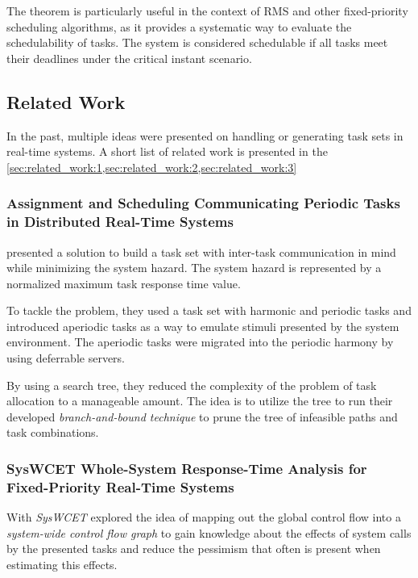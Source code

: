The theorem is particularly useful in the context of \ac{RMS} and other fixed-priority scheduling algorithms, as it provides a systematic way to evaluate the schedulability of tasks. 
The system is considered schedulable if all tasks meet their deadlines under the critical instant scenario.

\subsection{Related Work}\label{sec:related_work}
In the past, multiple ideas were presented on handling or generating task sets in real-time systems.
A short list of related work is presented in the \cref{sec:related_work:1,sec:related_work:2,sec:related_work:3}

\subsubsection{Assignment and Scheduling Communicating Periodic Tasks in Distributed Real-Time Systems}\label{sec:related_work:1}
\textcite{dar-tzenpengAssignmentSchedulingCommunicating1997} presented a solution to build a task set with inter-task communication in mind while minimizing the system hazard.
The system hazard is represented by a normalized maximum task response time value.

To tackle the problem, they used a task set with harmonic and periodic tasks and introduced aperiodic tasks as a way to emulate stimuli presented by the system environment.
The aperiodic tasks were migrated into the periodic harmony by using deferrable servers.

By using a search tree, they reduced the complexity of the problem of task allocation to a manageable amount.
The idea is to utilize the tree to run their developed \textit{branch-and-bound technique} to prune the tree of infeasible paths and task combinations.

\subsubsection{SysWCET\: Whole-System Response-Time Analysis for Fixed-Priority Real-Time Systems}\label{sec:related_work:2}
With \textit{SysWCET} \textcite{dietrichSysWCETWholeSystemResponseTime} explored the idea of mapping out the global control flow into a \textit{system-wide control flow graph} to gain knowledge about the effects of system calls by the presented tasks and reduce the pessimism that often is present when estimating this effects.

